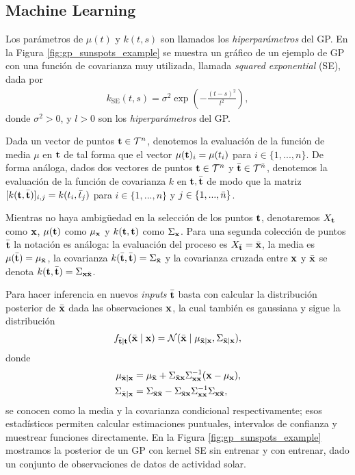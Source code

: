 \subsection{Machine Learning}

Los parámetros de \(\mu(t)\) y \(k(t, s)\) son llamados los \emph{hiperparámetros} del GP. En la Figura \ref{fig:gp_sunspots_example} se muestra un gráfico de un ejemplo de GP con una función de covarianza muy utilizada, llamada \emph{squared exponential} (SE), dada por
\begin{align*}
	k_{\mathrm{SE}}(t, s) = \sigma^2 \exp\left(-\frac{(t-s)^2}{l^2}\right),
\end{align*}
donde \(\sigma^2 > 0\), y \(l > 0\) son los \emph{hiperparámetros} del GP.

Dada un vector de puntos \(\mathbf{t} \in \mathcal{T}^n\), denotemos la evaluación de la función de media \(\mu\) en \(\mathbf{t}\) de tal forma que el vector \(\mu(\mathbf{t})_i = \mu(t_i)\) para \(i \in \{1,...,n\}\). De forma análoga, dados dos vectores de puntos \(\mathbf{t} \in \mathcal{T}^n\) y \(\bar{\mathbf{t}} \in \mathcal{T}^{\bar{n}}\), denotemos la evaluación de la función de covarianza \(k\) en \(\mathbf{t},\bar{\mathbf{t}}\) de modo que la matriz \([k(\mathbf{t},\bar{\mathbf{t}})]_{i,j} = k(t_i,\bar{t}_j)\) para \(i \in \{1,...,n\}\) y \(j \in \{1,...,\bar{n}\}\).

Mientras no haya ambigüedad en la selección de los puntos \(\mathbf{t}\), denotaremos \(X_{\mathbf{t}}\) como \(\mathbf{x}\), \(\mu(\mathbf{t})\) como \(\mu_{\mathbf{x}}\) y \(k(\mathbf{t},\mathbf{t})\) como \(\Sigma_{\mathbf{x}}\). Para una segunda colección de puntos \(\bar{\mathbf{t}}\) la notación es análoga: la evaluación del proceso es \(X_{\bar{\mathbf{t}}} = \bar{\mathbf{x}}\), la media es \(\mu(\bar{\mathbf{t}}) = \mu_{\bar{\mathbf{x}}}\), la covarianza \(k(\bar{\mathbf{t}},\bar{\mathbf{t}}) = \Sigma_{\bar{\mathbf{x}}}\) y la covarianza cruzada entre \(\mathbf{x}\) y \(\bar{\mathbf{x}}\) se denota \(k(\mathbf{t}, \bar{\mathbf{t}}) = \Sigma_{\mathbf{x} \bar{\mathbf{x}}}\).

Para hacer inferencia en nuevos \emph{inputs} \(\bar{\mathbf{t}}\) basta con calcular la distribución posterior de \(\bar{\mathbf{x}}\) dada las observaciones \(\mathbf{x}\), la cual también es gaussiana y sigue la distribución
\[f_{\bar{\mathbf{t}} \mid \mathbf{t}}(\bar{\mathbf{x}} \mid \mathbf{x}) = \mathcal{N}(\bar{\mathbf{x}} \mid \mu_{\bar{\mathbf{x}} \mid \mathbf{x}}, \Sigma_{\bar{\mathbf{x}} \mid \mathbf{x}}),\]
donde
\begin{align*}
	\mu_{\bar{\mathbf{x}} \mid \mathbf{x}}	&= \mu_{\bar{\mathbf{x}}} + \Sigma_{\bar{\mathbf{x}}\mathbf{x}} \Sigma_{\mathbf{x}\mathbf{x}}^{-1} (\mathbf{x} - \mu_{\mathbf{x}}),\\
	\Sigma_{\bar{\mathbf{x}} \mid \mathbf{x}}	&= \Sigma_{\bar{\mathbf{x}} \bar{\mathbf{x}}} - \Sigma_{\bar{\mathbf{x}} \mathbf{x}} \Sigma_{\mathbf{x} \mathbf{x}}^{-1} \Sigma_{\mathbf{x} \bar{\mathbf{x}}},
\end{align*}
se conocen como la media y la covarianza condicional respectivamente; esos estadísticos permiten calcular estimaciones puntuales, intervalos de confianza y muestrear funciones directamente. En la Figura \ref{fig:gp_sunspots_example} mostramos la posterior de un GP con kernel SE sin entrenar y con entrenar, dado un conjunto de observaciones de datos de actividad solar.

